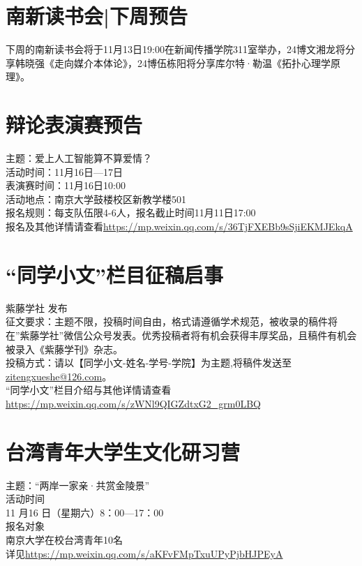 \documentclass[letterpaper, 12pt]{article}
\begin{document}
\begin{multicols}{2}
\section{南新读书会|下周预告}
下周的南新读书会将于11月13日19:00在新闻传播学院311室举办，24博文湘龙将分享韩晓强《走向媒介本体论》，24博伍栋阳将分享库尔特·勒温《拓扑心理学原理》。

\section{辩论表演赛预告}
主题：爱上人工智能算不算爱情？\\
活动时间：11月16日—17日\\
表演赛时间：11月16日10:00\\
活动地点：南京大学鼓楼校区新教学楼501\\
报名规则：每支队伍限4-6人，报名截止时间11月11日17:00\\
报名及其他详情请查看\url{https://mp.weixin.qq.com/s/36TjFXEBb9sSjiEKMJEkqA}\\

\section{“同学小文”栏目征稿启事}
紫藤学社 发布\\
征文要求：主题不限，投稿时间自由，格式请遵循学术规范，被收录的稿件将在”紫藤学社”微信公众号发表。优秀投稿者将有机会获得丰厚奖品，且稿件有机会被录入《紫藤学刊》杂志。\\
投稿方式：请以【同学小文-姓名-学号-学院】为主题,将稿件发送至\url{zitengxueshe@126.com}。\\
“同学小文”栏目介绍与其他详情请查看\url{https://mp.weixin.qq.com/s/zWNl9QIGZdtxG2_grm0LBQ}\\

\section{台湾青年大学生文化研习营}
主题：“两岸一家亲·共赏金陵景”\\
活动时间\\
11 月16 日（星期六）8：00—17：00\\
报名对象\\
南京大学在校台湾青年10名\\
详见\url{https://mp.weixin.qq.com/s/aKFvFMpTxuUPyPjbHJPEyA}


\end{multicols}
\end{document}
